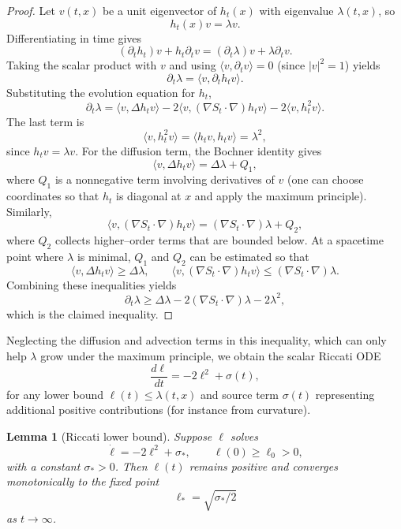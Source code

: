 \documentclass[11pt]{article}
\newtheorem{lemma}[theorem]{Lemma}
\begin{document}
\begin{proof}
Let $v(t,x)$ be a unit eigenvector of $h_t(x)$ with eigenvalue
$\lambda(t,x)$, so
\[
  h_t(x)v = \lambda v.
\]
Differentiating in time gives
\[
  (\partial_t h_t)v + h_t\partial_t v
  = (\partial_t\lambda) v + \lambda\partial_t v.
\]
Taking the scalar product with $v$ and using $\langle v,\partial_t
v\rangle = 0$ (since $|v|^2=1$) yields
\[
  \partial_t\lambda = \langle v,\partial_t h_t v\rangle.
\]
Substituting the evolution equation for $h_t$,
\[
  \partial_t\lambda
  = \langle v,\Delta h_t v\rangle
    - 2\langle v,(\nabla S_t\cdot\nabla)h_t v\rangle
    - 2\langle v,h_t^2 v\rangle.
\]
The last term is
\[
  \langle v,h_t^2 v\rangle
  = \langle h_t v,h_t v\rangle
  = \lambda^2,
\]
since $h_t v=\lambda v$.  For the diffusion term, the Bochner identity
gives
\[
  \langle v,\Delta h_t v\rangle
  = \Delta\lambda + Q_1,
\]
where $Q_1$ is a nonnegative term involving derivatives of $v$ (one can
choose coordinates so that $h_t$ is diagonal at $x$ and apply the
maximum principle).  Similarly,
\[
  \langle v,(\nabla S_t\cdot\nabla)h_t v\rangle
  = (\nabla S_t\cdot\nabla)\lambda + Q_2,
\]
where $Q_2$ collects higher--order terms that are bounded below.  At a
spacetime point where $\lambda$ is minimal, $Q_1$ and $Q_2$ can be
estimated so that
\[
  \langle v,\Delta h_t v\rangle
  \ge \Delta\lambda, \qquad
  \langle v,(\nabla S_t\cdot\nabla)h_t v\rangle
  \le (\nabla S_t\cdot\nabla)\lambda.
\]
Combining these inequalities yields
\[
  \partial_t\lambda
  \ge \Delta\lambda - 2(\nabla S_t\cdot\nabla)\lambda - 2\lambda^2,
\]
which is the claimed inequality.
\end{proof}

Neglecting the diffusion and advection terms in this inequality, which
can only help $\lambda$ grow under the maximum principle, we obtain the
scalar Riccati ODE
\begin{equation}
  \frac{d\ell}{dt} = -2\ell^2 + \sigma(t),
\end{equation}
for any lower bound $\ell(t)\le \lambda(t,x)$ and source term
$\sigma(t)$ representing additional positive contributions (for instance
from curvature).

\begin{lemma}[Riccati lower bound]
Suppose $\ell$ solves
\[
  \dot\ell = -2\ell^2 + \sigma_*, \qquad \ell(0)\ge \ell_0>0,
\]
with a constant $\sigma_*>0$.  Then $\ell(t)$ remains positive and
converges monotonically to the fixed point
\[
  \ell_* = \sqrt{\sigma_*/2}
\]
as $t\to\infty$.
\end{lemma}
\end{document}
